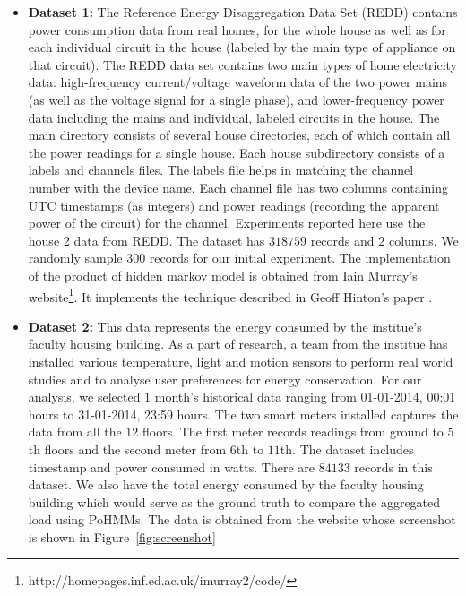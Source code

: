 \documentclass[conference]{IEEEtran}
\begin{document}
\begin{itemize}
\item \textbf{Dataset 1:} The Reference Energy Disaggregation Data Set (REDD) contains power consumption data from real homes, for the whole house as well as for each individual circuit in
the house (labeled by the main type of appliance on that circuit). %
The REDD data set contains two main types of home electricity data: high-frequency current/voltage waveform data of the two power mains (as well as the voltage signal for a single phase), and lower-frequency power data including the mains and individual, labeled circuits in the house. 
The main directory consists of several house directories, each of which contain all the power readings for a single house.  Each house subdirectory consists of a labels and channels files. The labels file helps in matching the channel number with the device name. Each channel file has two columns containing UTC timestamps (as integers) and power readings (recording the apparent power of the circuit) for the channel.
Experiments reported here use the house 2 data from REDD. The dataset has $318759$ records and $2$ columns. We randomly sample $300$ records for our initial experiment.
The implementation of the product of hidden markov model is obtained from Iain Murray's website\footnote{\label{link}http://homepages.inf.ed.ac.uk/imurray2/code/}. It implements the technique described in Geoff Hinton's paper \cite{hinton2000}.


\item \textbf{Dataset 2:} This data represents the energy consumed by the institue's faculty housing building. As a part of research, a team from the institue has installed various temperature, light and motion sensors to perform real world studies and to analyse user preferences for energy conservation. For our analysis, we selected $1$ month's historical data ranging from 01-01-2014, 00:01 hours to 31-01-2014, 23:59 hours. The two smart meters installed captures the data from all the $12$ floors. The first meter records readings from ground to $5$th floors and the second meter from $6$th to $11$th. The dataset includes timestamp and power consumed in watts. There are $84133$ records in this dataset. We also have the total energy consumed by the faculty housing building which would serve as the ground truth to compare the aggregated load using PoHMMs. The data is obtained from the website whose screenshot is shown in Figure~\ref{fig:screenshot}



\end{itemize}
\end{document}
